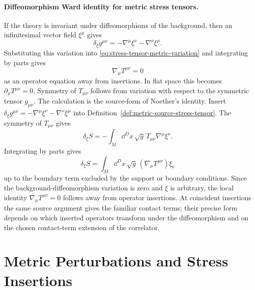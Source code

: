 \paragraph{Diffeomorphism Ward identity for metric stress tensors.}
If the theory is invariant under diffeomorphisms of the background, then an
infinitesimal vector field \(\xi^\mu\) gives
\[
  \delta_\xi g^{\mu\nu}
  =
  -\nabla^\mu\xi^\nu-\nabla^\nu\xi^\mu .
\]
Substituting this variation into
\eqref{eq:stress-tensor-metric-variation} and integrating by parts gives
\begin{equation}
  \nabla_\mu T^{\mu\nu}=0
  \label{eq:stress-tensor-covariant-conservation}
\end{equation}
as an operator equation away from insertions.  In flat space this becomes
\(\partial_\mu T^{\mu\nu}=0\).  Symmetry of \(T_{\mu\nu}\) follows from
variation with respect to the symmetric tensor \(g_{\mu\nu}\).
The calculation is the source-form of Noether's identity.  Insert
\(\delta_\xi g^{\mu\nu}=-\nabla^\mu\xi^\nu-\nabla^\nu\xi^\mu\) into
Definition~\ref{def:metric-source-stress-tensor}.  The symmetry of
\(T_{\mu\nu}\) gives
\[
  \delta_\xi S
  =
  -\int_M\dd^Dx\,\sqrt g\,T_{\mu\nu}\nabla^\mu\xi^\nu .
\]
Integrating by parts gives
\[
  \delta_\xi S
  =
  \int_M\dd^Dx\,\sqrt g\,(\nabla_\mu T^{\mu\nu})\xi_\nu
\]
up to the boundary term excluded by the support or boundary conditions.  Since
the background-diffeomorphism variation is zero and \(\xi\) is arbitrary, the
local identity \(\nabla_\mu T^{\mu\nu}=0\) follows away from operator
insertions.  At coincident insertions the same source argument gives the
familiar contact terms; their precise form depends on which inserted
operators transform under the diffeomorphism and on the chosen contact-term
extension of the correlator.

\section{Metric Perturbations and Stress Insertions}

